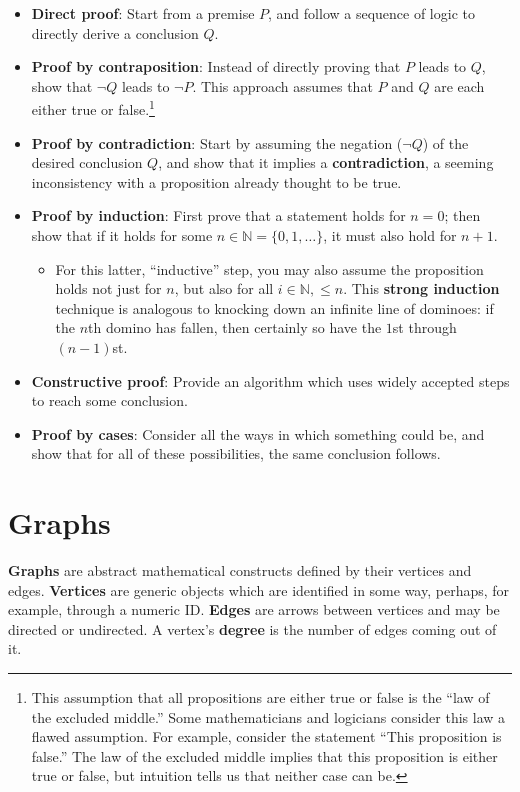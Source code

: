 \documentclass[12pt]{article}
\begin{document}
\begin{itemize}
\item \textbf{Direct proof}: Start from a premise $P$, and follow a sequence of logic to directly derive a conclusion $Q$.
\item \textbf{Proof by contraposition}: Instead of directly proving that $P$ leads to $Q$, show that $\neg Q$ leads to $\neg P$. This approach assumes that $P$ and $Q$ are each either true or false.\footnote{This assumption that all propositions are either true or false is the ``law of the excluded middle.'' Some mathematicians and logicians consider this law a flawed assumption. For example, consider the statement ``This proposition is false.'' The law of the excluded middle implies that this proposition is either true or false, but intuition tells us that neither case can be.}
\item \textbf{Proof by contradiction}: Start by assuming the negation ($\neg Q$) of the desired conclusion $Q$, and show that it implies a \textbf{contradiction}, a seeming inconsistency with a proposition already thought to be true.
\item \textbf{Proof by induction}: First prove that a statement holds for $n = 0$; then show that if it holds for some $n \in \mathbb N = \{ 0, 1, \ldots \}$, it must also hold for $n + 1$.
\begin{itemize}
\item For this latter, ``inductive'' step, you may also assume the proposition holds not just for $n$, but also for all $i \in \mathbb N, \leq n$. This \textbf{strong induction} technique is analogous to knocking down an infinite line of dominoes: if the $n$th domino has fallen, then certainly so have the $1$st through $(n - 1)$st.
\end{itemize}
\item \textbf{Constructive proof}: Provide an algorithm which uses widely accepted steps to reach some conclusion.
\item \textbf{Proof by cases}: Consider all the ways in which something could be, and show that for all of these possibilities, the same conclusion follows.
\end{itemize}

\section{Graphs}

\textbf{Graphs} are abstract mathematical constructs defined by their vertices and edges. \textbf{Vertices} are generic objects which are identified in some way, perhaps, for example, through a numeric ID. \textbf{Edges} are arrows between vertices and may be directed or undirected. A vertex's \textbf{degree} is the number of edges coming out of it.
\end{document}
